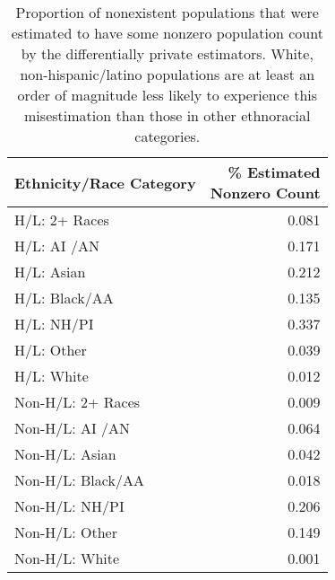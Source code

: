 \begin{table}[ht]
\centering
\begin{tabular}{l|r}
 Ethnicity/Race Category & \thead{\% Estimated \\ Nonzero Count} \\ 
  \hline
  H/L: 2+ Races & 0.081 \\ 
  H/L: AI /AN & 0.171 \\ 
  H/L: Asian & 0.212 \\ 
  H/L: Black/AA & 0.135 \\ 
  H/L: NH/PI & 0.337 \\ 
  H/L: Other & 0.039 \\ 
  H/L: White & 0.012 \\ 
   \hline
  Non-H/L: 2+ Races & 0.009 \\ 
  Non-H/L: AI /AN & 0.064 \\ 
  Non-H/L: Asian & 0.042 \\ 
  Non-H/L: Black/AA & 0.018 \\ 
  Non-H/L: NH/PI & 0.206 \\ 
  Non-H/L: Other & 0.149 \\ 
  Non-H/L: White & 0.001 \\ 
  \end{tabular}
  \caption{Proportion of nonexistent populations that were estimated to have some nonzero population count by the differentially private estimators. White, non-hispanic/latino populations are at least an order of magnitude less likely to experience this misestimation than those in other ethnoracial categories.}
  \label{ref:nonzero-by}
\end{table}
